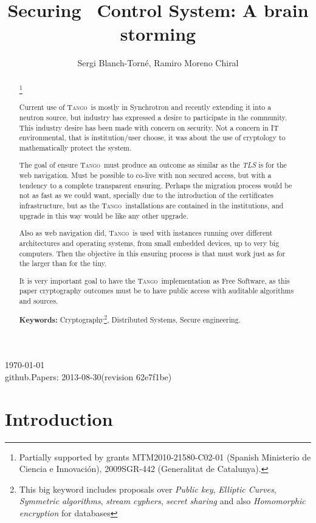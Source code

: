\documentclass[10pt,a4paper,twoside]{llncs}
\title{Securing \tango\, Control System: A brain storming}
\author{Sergi Blanch-Torn\'e\inst{1}, Ramiro Moreno Chiral\inst{2}}
\institute{
 Escola Polit\`ecnica Superior, Universitat de Lleida. Spain.\\
 \email{\tt sblanch@alumnes.udl.es}
 \and 
 Departament de Matem\`atica. Universitat de Lleida. Spain.\\
 \email{\tt ramiro@matematica.udl.es}
 }
\newcommand{\version}{github.Papers: 2013-08-30\;(revision 62e7f1be) } %
\newcommand{\tango}{\textsc{Tango}}
\begin{document}
\maketitle
\begin{center}
 \today\\
 \version
\end{center}


\begin{abstract}\footnote{Partially supported by grants MTM2010-21580-C02-01 (Spanish Ministerio de Ciencia e Innovaci\'on), 2009SGR-442 (Generalitat de Catalunya).}

Current use of \tango\, is mostly in Synchrotron and recently extending it into a neutron source, but industry has expressed a desire to participate in the community. This industry desire has been made with concern on security. Not a concern in IT environmental, that is institution/user choose, it was about the use of cryptology to mathematically protect the system.

The goal of ensure \tango\, must produce an outcome as similar as the \emph{TLS} is for the web navigation. Must be possible to co-live with non secured access, but with a tendency to a complete transparent ensuring. Perhaps the migration process would be not as fast as we could want, specially due to the introduction of the certificates infrastructure, but as the \tango\, installations are contained in the institutions, and upgrade in this way would be like any other upgrade.

Also as web navigation did, \tango\, is used with instances running over different architectures and operating systems, from small embedded devices, up to very big computers. Then the objective in this ensuring process is that must work just as for the larger than for the tiny.

It is very important goal to have the \tango\, implementation as Free Software, as this paper cryptography outcomes must be to have public access with auditable algorithms and sources.
   
{\bf Keywords:} Cryptography\footnote{This big keyword includes proposals over \emph{Public key}, \emph{Elliptic Curves}, \emph{Symmetric algorithms}, \emph{stream cyphers}, \emph{secret sharing} and also \emph{Homomorphic encryption} for databases}, Distributed Systems, Secure engineering.

\end{abstract}

%
\section{Introduction \label{sec:introduction}}
\end{document}
